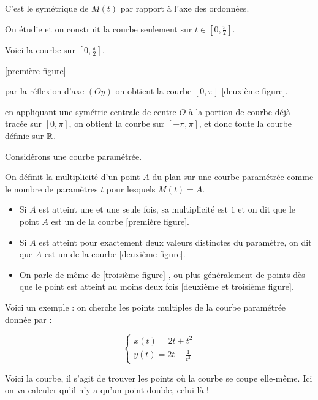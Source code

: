 C'est le symétrique de $M(t)$ par rapport à l'axe des ordonnées. 

\change
On étudie et on construit la courbe seulement sur $t\in[0,\frac{\pi}{2}]$.

\change
Voici la courbe sur $[0,\frac{\pi}{2}]$.

[première figure]

\change
par la réflexion d'axe $(Oy)$ on obtient la courbe $[0,\pi]$
[deuxième figure].

\change
en appliquant une symétrie centrale de centre $O$ 
à la portion de courbe déjà tracée sur $[0,\pi]$, on obtient la courbe 
sur $[-\pi,\pi]$, et donc toute la courbe définie sur $\mathbb{R}$.

\diapo

Considérons une courbe paramétrée.

On définit la multiplicité d'un point $A$ du plan sur une 
courbe paramétrée comme le nombre de paramètres $t$ 
pour lesquels $M(t)=A$.

\change
\begin{itemize}
\item Si $A$ est atteint une et une seule fois, sa multiplicité est $1$ 
et on dit que le point $A$ est un  
de la courbe [première figure].

\item Si $A$ est atteint pour exactement deux valeurs distinctes du paramètre, 
on dit que $A$ est un  de la courbe [deuxième figure].

\item On parle de même de  [troisième figure]
, 
ou plus généralement de points  
dès que le point est atteint au moins deux fois [deuxième et troisième figure].

\end{itemize}


\diapo

Voici un exemple : on cherche les points multiples de 
la courbe paramétrée donnée par : 

$$\left\{
\begin{array}{l}
x(t)=2t+t^2\\
y(t)=2t-\frac{1}{t^2}
\end{array}
\right.$$

\change

Voici la courbe, il s'agit de trouver les points 
où la courbe se coupe elle-même. Ici on va calculer
qu'il n'y a qu'un point double, celui là !

